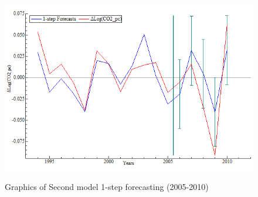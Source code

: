 \documentclass[12pt, a4paper]{article}
\begin{document}
\begin{figure}[h]
  \begin{center}
    \caption{Graphics of Second model 1-step forecasting (2005-2010)}
    \includegraphics[scale=0.8]{fig5.png}
    \label{fig5} 
  \end{center}
\end{figure}


\newpage
\end{document}
